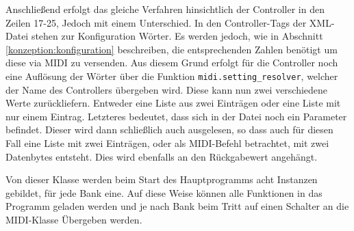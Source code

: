 Anschließend erfolgt das gleiche Verfahren hinsichtlich der Controller in den Zeilen 17-25, Jedoch mit einem Unterschied. In den Controller-Tags der XML-Datei stehen zur Konfiguration Wörter. Es werden jedoch, wie in Abschnitt \ref{konzeption:konfiguration} beschreiben, die entsprechenden Zahlen benötigt um diese via MIDI zu versenden. Aus diesem Grund erfolgt für die Controller noch eine Auflösung der Wörter über die Funktion \lstinline[language=mypython]{midi.setting_resolver}, welcher der Name des Controllers übergeben wird. Diese kann nun zwei verschiedene Werte zurückliefern. Entweder eine Liste aus zwei Einträgen oder eine Liste mit nur einem Eintrag. Letzteres bedeutet, dass sich in der Datei noch ein Parameter befindet. Dieser wird dann schließlich auch ausgelesen, so dass auch für diesen Fall eine Liste mit zwei Einträgen, oder als MIDI-Befehl betrachtet, mit zwei Datenbytes entsteht. Dies wird ebenfalls an den Rückgabewert angehängt.
 
Von dieser Klasse werden beim Start des Hauptprogramms acht Instanzen gebildet, für jede Bank eine. Auf diese Weise können alle Funktionen in das Programm geladen werden und je nach Bank beim Tritt auf einen Schalter an die MIDI-Klasse Übergeben werden.



